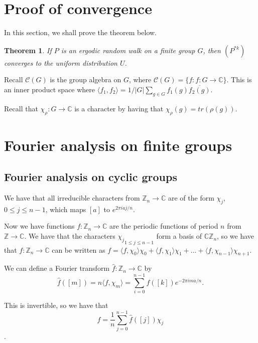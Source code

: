\documentclass[]{article}
\newtheorem{theorem}{Theorem}
\theoremstyle{definition}
\numberwithin{theorem}{section}
\numberwithin{equation}{section}
\begin{document}
\section{Proof of convergence}
In this section, we shall prove the theorem below.
\begin{theorem}
	If $P$ is an ergodic random walk on a finite group $G$, then $(P^{\ast k})$ converges to the uniform distribution $U$. 
\end{theorem}
Recall $\mathcal{C}(G)$ is the group algebra on $G$, where $\mathcal{C}(G) = \lbrace f : f: G \rightarrow \mathbb{C} \rbrace$. This is an inner product space where $\langle f_1, f_2 \rangle = 1/|G| \sum_{g \in G} f_1(g) \overline{f_2(g)}$. 

Recall that $\chi_\rho: G \rightarrow \mathbb{C}$ is a character by having that $\chi_\rho(g) = tr(\rho(g))$.

\section{Fourier analysis on finite groups}
\subsection{Fourier analysis on cyclic groups}
We have that all irreducible characters from $\mathbb{Z}_n \rightarrow \mathbb{C}$ are of the form $\chi_j$, $0 \leq j \leq n-1$, which maps $[a]$ to $e^{2 \pi i a j/n}$. 

Now we have functions $f: \mathbb{Z}_n \rightarrow \mathbb{C}$ are the periodic functions of period $n$ from $\mathbb{Z} \rightarrow \mathbb{C}$. We have that the characters ${\chi_j}_{1 \leq j \leq n-1}$ form a basis of $\mathbb{C}\mathbb{Z}_n$, so we have that $f : \mathbb{Z}_n \rightarrow \mathbb{C}$ can be written as $f = \langle f, \chi_0 \rangle \chi_0 + \langle f, \chi_1 \rangle \chi_1 + ... + \langle f , \chi_{n-1} \rangle \chi_{n+1}$.

We can define a Fourier transform $\widehat{f}: \mathbb{Z}_n \rightarrow \mathbb{C}$ by 
\begin{equation}
	\widehat{f}([m]) = n \langle f, \chi_m \rangle = \sum_{i = 0}^{n-1}f([k]) e^{-2\pi i ma/n}.
\end{equation}

This is invertible, so we have that
\begin{equation}
	f = \frac{1}{n}\sum_{j = 0}^{n-1} \widehat{f}([j])\chi_j
\end{equation}
.
\end{document}
